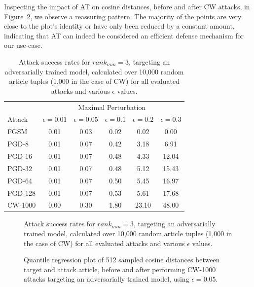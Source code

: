 Inspecting the impact of \ac{AT} on cosine distances, before and after \ac{CW} attacks, in Figure~\ref{fig:adv-quantile}, we observe a reassuring pattern. The majority of the points are very close to the plot's identity or have only been reduced by a constant amount, indicating that \ac{AT} can indeed be considered an efficient defense mechanism for our use-case.
\begin{table}[H]
	\centering
	\begin{tabular}{ lccccc } 
		\toprule		
		& \multicolumn{5}{c}{Maximal Perturbation} \\
		\cmidrule{2-6}
		Attack & $\epsilon = 0.01$ & $\epsilon = 0.05$ & $\epsilon = 0.1$  & $\epsilon = 0.2$ & $\epsilon = 0.3$  \\
		\midrule
		FGSM & 0.01 & 0.03 & 0.02 & 0.02 & 0.00 \\
		PGD-8 & 0.01 & 0.07 & 0.42 & 3.18 & 6.91 \\
		PGD-16 & 0.01 & 0.07 & 0.48 & 4.33 & 12.04 \\
		PGD-32 & 0.01 & 0.07 & 0.48 & 5.12 & 15.43 \\
		PGD-64 & 0.01 & 0.07 & 0.50 & 5.45 & 16.97 \\
		PGD-128 & 0.01 & 0.07 & 0.53 & 5.61 & 17.68 \\
		CW-1000 & 0.00 & 0.30 & 1.80 & 23.10 & 48.00 \\
		\bottomrule
	\end{tabular}
	\caption{Attack success rates for $rank_{min}=3$, targeting an adversarially trained model, calculated over 10,000 random article tuples (1,000 in the case of \acs{CW}) for all evaluated attacks and various $\epsilon$ values.}
	\label{tab:adv-training-results}
\end{table}
\begin{figure}[H]
	\centering
	
	\caption{Attack success rates for $rank_{min}=3$, targeting an adversarially trained model, calculated over 10,000 random article tuples (1,000 in the case of \acs{CW}) for all evaluated attacks and various $\epsilon$ values.}
	\label{fig:top3-adv-success}
\end{figure}
\begin{figure}[H]
	\centering
	
	\caption{Quantile regression plot of 512 sampled cosine distances between target and attack article, before and after performing \acs{CW}-1000 attacks targeting an adversarially trained model, using $\epsilon=0.05$.}
	\label{fig:adv-quantile}
\end{figure}

